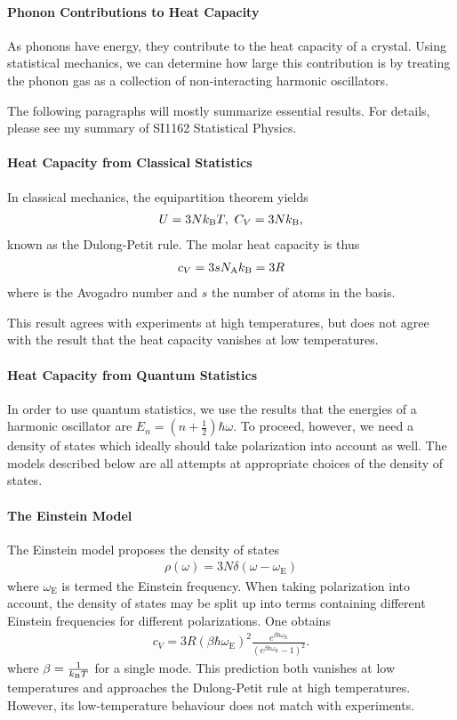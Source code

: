 \paragraph{Phonon Contributions to Heat Capacity}
As phonons have energy, they contribute to the heat capacity of a crystal. Using statistical mechanics, we can determine how large this contribution is by treating the phonon gas as a collection of non-interacting harmonic oscillators.

The following paragraphs will mostly summarize essential results. For details, please see my summary of SI1162 Statistical Physics.

\paragraph{Heat Capacity from Classical Statistics}
In classical mechanics, the equipartition theorem yields
\begin{align*}
	U = 3Nk_{\text{B}} T,\ C_{V} = 3Nk_{\text{B}}, 
\end{align*}
known as the Dulong-Petit rule. The molar heat capacity is thus
\begin{align*}
	c_{V} = 3sN_{\text{A}}k_{\text{B}} = 3R
\end{align*}
where \Na is the Avogadro number and $s$ the number of atoms in the basis.

This result agrees with experiments at high temperatures, but does not agree with the result that the heat capacity vanishes at low temperatures.

\paragraph{Heat Capacity from Quantum Statistics}
In order to use quantum statistics, we use the results that the energies of a harmonic oscillator are $E_{n} = \left(n + \frac{1}{2}\right)\hbar\omega$. To proceed, however, we need a density of states which ideally should take polarization into account as well. The models described below are all attempts at appropriate choices of the density of states.

\paragraph{The Einstein Model}
The Einstein model proposes the density of states
\begin{align*}
	\rho(\omega) = 3N\delta(\omega - \omega_{\text{E}})
\end{align*}
where $\omega_{\text{E}}$ is termed the Einstein frequency. When taking polarization into account, the density of states may be split up into terms containing different Einstein frequencies for different polarizations. One obtains
\begin{align*}
	c_{V} = 3R\left(\beta\hbar\omega_{\text{E}}\right)^{2}\frac{e^{\beta\hbar\omega_{\text{E}}}}{\left(e^{\beta\hbar\omega_{\text{E}}} - 1\right)^{2}}.
\end{align*}
where $\beta = \frac{1}{k_{\text{B}} T}$ for a single mode. This prediction both vanishes at low temperatures and approaches the Dulong-Petit rule at high temperatures. However, its low-temperature behaviour does not match with experiments.


